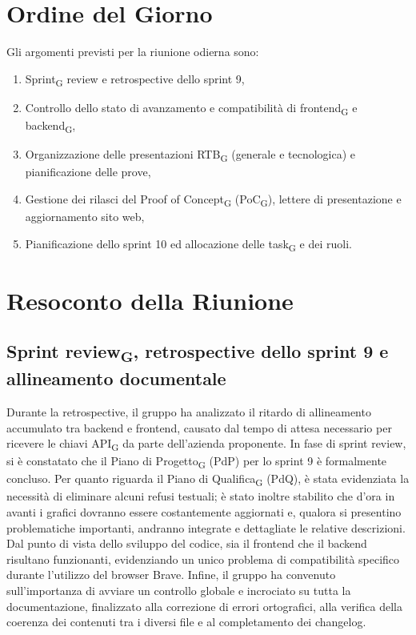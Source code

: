 \section{Ordine del Giorno}
Gli argomenti previsti per la riunione odierna sono:
\begin{enumerate}
    \item Sprint\textsubscript{G} review e retrospective dello sprint 9,
    \item Controllo dello stato di avanzamento e compatibilità di frontend\textsubscript{G} e backend\textsubscript{G},
    \item Organizzazione delle presentazioni RTB\textsubscript{G} (generale e tecnologica) e pianificazione delle prove,
    \item Gestione dei rilasci del Proof of Concept\textsubscript{G} (PoC\textsubscript{G}), lettere di presentazione e aggiornamento sito web,
    \item Pianificazione dello sprint 10 ed allocazione delle task\textsubscript{G} e dei ruoli.
\end{enumerate}

\section{Resoconto della Riunione}

\subsection{Sprint review\textsubscript{G}, retrospective dello sprint 9 e allineamento documentale}
Durante la retrospective, il gruppo ha analizzato il ritardo di allineamento accumulato tra backend e frontend, causato dal tempo di attesa necessario per ricevere le chiavi API\textsubscript{G} da parte dell'azienda proponente. 
In fase di sprint review, si è constatato che il Piano di Progetto\textsubscript{G} (PdP) per lo sprint 9 è formalmente concluso. Per quanto riguarda il Piano di Qualifica\textsubscript{G} (PdQ), è stata evidenziata la necessità di eliminare alcuni refusi testuali; è stato inoltre stabilito che d'ora in avanti i grafici dovranno essere costantemente aggiornati e, qualora si presentino problematiche importanti, andranno integrate e dettagliate le relative descrizioni. 
Dal punto di vista dello sviluppo del codice, sia il frontend che il backend risultano funzionanti, evidenziando un unico problema di compatibilità specifico durante l'utilizzo del browser Brave. Infine, il gruppo ha convenuto sull'importanza di avviare un controllo globale e incrociato su tutta la documentazione, finalizzato alla correzione di errori ortografici, alla verifica della coerenza dei contenuti tra i diversi file e al completamento dei changelog.

